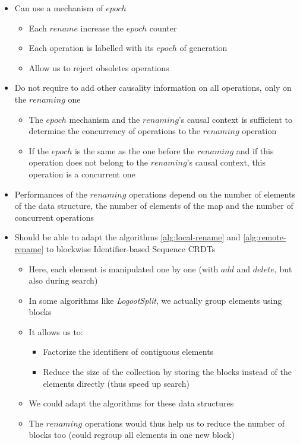 \documentclass[a4paper]{article}
\begin{document}
\begin{itemize}
  \item Can use a mechanism of $epoch$
  \begin{itemize}
    \item Each $rename$ increase the $epoch$ counter
    \item Each operation is labelled with its $epoch$ of generation
    \item Allow us to reject obsoletes operations
  \end{itemize}
  \item Do not require to add other causality information on all operations, only on the $renaming$ one
  \begin{itemize}
    \item The $epoch$ mechanism and the $renaming$'s causal context is sufficient
      to determine the concurrency of operations to the $renaming$ operation
    \item If the $epoch$ is the same as the one before the $renaming$
      and if this operation does not belong to the $renaming$'s causal context,
      this operation is a concurrent one
  \end{itemize}
  \item Performances of the $renaming$ operations depend on the number of elements
    of the data structure, the number of elements of the map
    and the number of concurrent operations
  \item Should be able to adapt the algorithms \ref{alg:local-rename} and \ref{alg:remote-rename}
    to blockwise Identifier-based Sequence \acp{CRDT}
  \begin{itemize}
    \item Here, each element is manipulated one by one (with $add$ and $delete$, but also during search)
    \item In some algorithms like \emph{LogootSplit},
      we actually group elements using blocks
    \item It allows us to:
    \begin{itemize}
      \item Factorize the identifiers of contiguous elements
      \item Reduce the size of the collection by storing
        the blocks instead of the elements directly (thus speed up search)
    \end{itemize}
    \item We could adapt the algorithms for these data structures
    \item The $renaming$ operations would thus help us
      to reduce the number of blocks too (could regroup all elements in one new block)
  \end{itemize}
\end{itemize}
\end{document}
